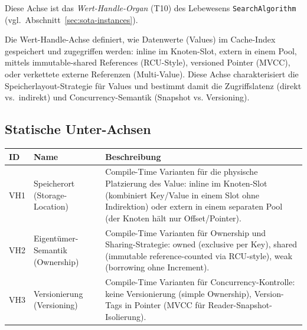 Diese Achse ist das \emph{Wert-Handle-Organ} (T10) des Lebewesens \texttt{SearchAlgorithm} (vgl.\ Abschnitt~\ref{sec:sota-instances}).

Die Wert-Handle-Achse definiert, wie Datenwerte (Values) im Cache-Index gespeichert und zugegriffen werden: inline im Knoten-Slot, extern in einem Pool, mittels immutable-shared References (RCU-Style), versioned Pointer (MVCC), oder verkettete externe Referenzen (Multi-Value). Diese Achse charakterisiert die Speicherlayout-Strategie für Values und bestimmt damit die Zugriffslatenz (direkt vs.\ indirekt) und Concurrency-Semantik (Snapshot vs. Versioning).

\subsection*{Statische Unter-Achsen}
\begin{scriptsize}
\begin{longtable}{@{}>{\raggedright\arraybackslash}p{1.8cm} >{\raggedright\arraybackslash}p{3.2cm} >{\raggedright\arraybackslash}p{8.5cm}@{}}
\toprule
ID & Name & Beschreibung \\
\midrule
\endhead%
VH1 & Speicherort (Storage-Location) & Compile-Time Varianten für die physische Platzierung des Value: inline im Knoten-Slot (kombiniert Key/\allowbreak{}Value in einem Slot ohne Indirektion) oder extern in einem separaten Pool (der Knoten hält nur Offset/\allowbreak{}Pointer). \\
VH2 & Eigentümer-Semantik (Ownership) & Compile-Time Varianten für Ownership und Sharing-Strategie: owned (exclusive per Key), shared (immutable reference-counted via RCU-style), weak (borrowing ohne Increment). \\
VH3 & Versionierung (Versioning) & Compile-Time Varianten für Concurrency-Kontrolle: keine Versionierung (simple Ownership), Version-Tags in Pointer (MVCC für Reader-Snapshot-Isolierung). \\
\bottomrule
\end{longtable}
\end{scriptsize}

